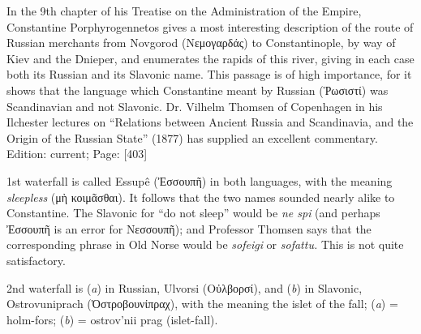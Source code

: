 
In the 9th chapter of his Treatise on the Administration of the Empire, Constantine Porphyrogennetos gives a most interesting description of the route of Russian merchants from Novgorod (\textgreek{Νεμογαρδάς}) to Constantinople, by way of Kiev and the Dnieper, and enumerates the rapids of this river, giving in each case both its Russian and its Slavonic name. This passage is of high importance, for it shows that the language which Constantine meant by Russian (\textgreek{\texthebrew{Ῥ}ωσιστί}) was Scandinavian and not Slavonic. Dr. Vilhelm Thomsen of Copenhagen in his Ilchester lectures on \texthebrew{“}Relations between Ancient Russia and Scandinavia, and the Origin of the Russian State\texthebrew{}” (1877) has supplied an excellent commentary.
Edition: current; Page: [403]

1st
waterfall is called Essupê (\textgreek{\texthebrew{Ἐ}σσουπ\texthebrew{ῆ}}) in both languages, with the meaning \emph{sleepless} (\textgreek{μ\texthebrew{ὴ} κοιμ\texthebrew{ᾶ}σθαι}). It follows that the two names sounded nearly alike to Constantine. The Slavonic for \texthebrew{“}do not sleep\texthebrew{}” would be \emph{ne spi} (and perhaps \textgreek{\texthebrew{Ἐ}σσουπ\texthebrew{ῆ}} is an error for \textgreek{Νεσσουπ\texthebrew{ῆ}}); and Professor Thomsen says that the corresponding phrase in Old Norse would be \emph{sofeigi} or \emph{sofattu.} This is not quite satisfactory.

2nd
waterfall is (\emph{a}) in Russian, Ulvorsi (\textgreek{Ο\texthebrew{ὐ}λβορσί}), and (\emph{b}) in Slavonic, Ostrovuniprach (\textgreek{\texthebrew{Ὀ}στροβουνίπραχ}), with the meaning the islet of the fall; (\emph{a}) = holm-fors; (\emph{b}) = ostrov\texthebrew{}’nii prag (islet-fall).

